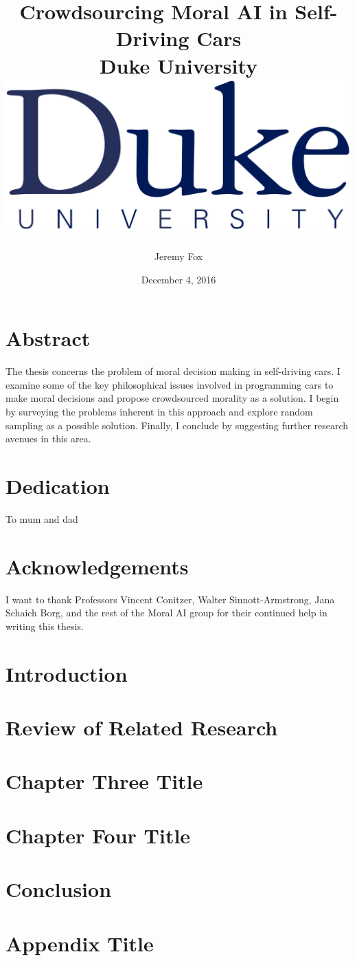 \documentclass[12pt]{report}
\title{
	{Crowdsourcing Moral AI in Self-Driving Cars}\\
	{\large Duke University}\\
	{\includegraphics[width=\textwidth]{duke.png}}
}
\author{Jeremy Fox}
\date{December 4, 2016}
\begin{document}
\maketitle




\chapter*{Abstract}
The thesis concerns the problem of moral decision making in self-driving cars. I examine some of the key philosophical issues involved in programming cars to make moral decisions and propose crowdsourced morality as a solution. I begin by surveying the problems inherent in this approach and explore random sampling as a possible solution. Finally, I conclude by suggesting further research avenues in this area.

\chapter*{Dedication}
To mum and dad

\chapter*{Acknowledgements}
I want to thank Professors Vincent Conitzer, Walter Sinnott-Armstrong, Jana Schaich Borg, and the rest of the Moral AI group for their continued help in writing this thesis.

\tableofcontents

\chapter{Introduction}


\chapter{Review of Related Research}


\chapter{Chapter Three Title}


\chapter{Chapter Four Title}


\chapter{Conclusion}


\appendix
\chapter{Appendix Title}





\end{document}
